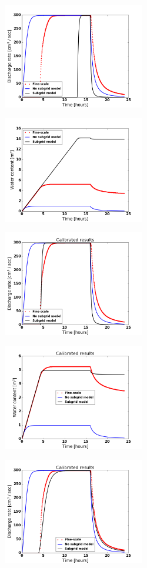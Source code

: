 \documentclass[review,11pt]{elsarticle}
\begin{document}
\begin{figure}
\centering
\includegraphics[width=6.2cm, height=5cm]{./figures/POLYGON31/POLYGON31discharge.png}
\includegraphics[width=6.2cm, height=5cm]{./figures/POLYGON31/POLYGON31watercontent.png}\\
\includegraphics[width=6.2cm, height=5cm]{./figures/POLYGON31/POLYGON31dischargeCalibDD.png}
\includegraphics[width=6.2cm, height=5cm]{./figures/POLYGON31/POLYGON31watercontentCalibDD.png} \\
\includegraphics[width=6.2cm, height=5cm]{./figures/POLYGON31/POLYGON31dischargeCalibDDManning.png}

\end{figure}
\end{document}
